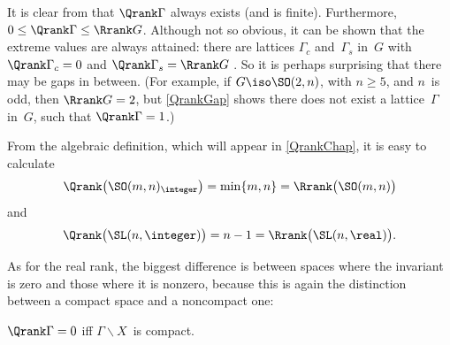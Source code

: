 \begin{rem} \label{QrankPossiblesMentioned}
 It is clear from 
that $\Qrank\Gamma$ always exists (and is finite). Furthermore,
$0 \le \Qrank\Gamma \le \Rrank G$. Although not so obvious, it can be shown that the extreme values are always
attained: there are lattices $\Gamma_c$ and~$\Gamma_s$ in~$G$ with
$\Qrank\Gamma_c = 0$ and $\Qrank\Gamma_s = \Rrank G$ . So it is
perhaps surprising that there may be gaps in between. 
(For example,  if $G \iso \SO(2,n)$, with $n \ge 5$, and
$n$~is odd, then $\Rrank G = 2$, but \cref{QrankGap} shows
there does not exist a lattice~$\Gamma$ in~$G$, such that $\Qrank\Gamma = 1$.)
 \end{rem}

\begin{eg} \label{QrankIntroEgs}
 From the algebraic definition, which will appear in
\cref{QrankChap}, it is easy to calculate 
 $$\Qrank \bigl( \SO(m,n)_{\integer} \bigr) = \min\{m,n\} = \Rrank \bigl(
\SO(m,n) \bigr)$$
 and 
 $$\Qrank \bigl( \SL(n,\integer) \bigr) = n-1 = \Rrank \bigl(
\SL(n,\real) \bigr) .$$
 \end{eg}

As for the real rank, the biggest difference is between spaces where the
invariant is zero and those where it is nonzero, because this is again
the distinction between a compact space and a noncompact one:

\begin{thm} \label{Qrank0<>cocpct}
 $\Qrank\Gamma = 0$ iff\/ $\Gamma
\backslash X$~is compact.
 \end{thm}

